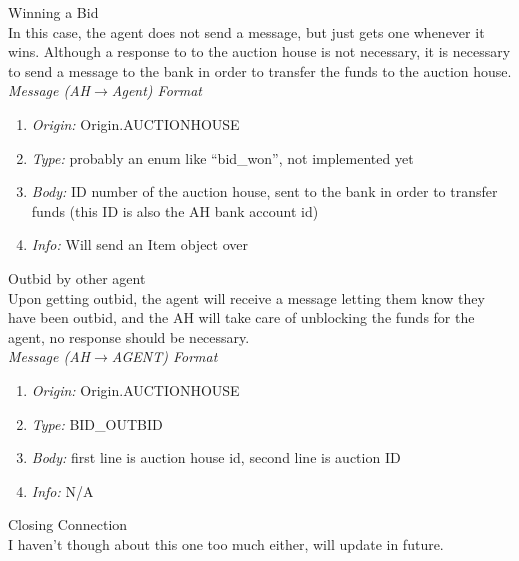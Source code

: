 \documentclass{article}
\begin{document}
\clearpage


\large
Winning a Bid 
\normalsize
\\ In this case, the agent does not send a message, but just gets one whenever it wins. Although a response to to the auction house is not necessary, it is necessary to send a message to the bank in order to transfer the funds to the auction house. 
\footnotesize
\\\emph{Message (AH$\to$Agent) Format} 
\begin{enumerate} 
	\item[]\emph{Origin:} Origin.AUCTIONHOUSE
	\item[]\emph{Type:} probably an enum like ``bid\_won'', not implemented yet 
	\item[]\emph{Body:} ID number of the auction house, sent to the bank in order to transfer funds (this ID is also the AH bank account id) 
	\item[]\emph{Info:} Will send an Item object over 
\end{enumerate}

\vspace{1cm} 

\large
Outbid by other agent 
\normalsize
\\Upon getting outbid, the agent will receive a message letting them know they have been outbid, and the AH will take care of unblocking the funds for the agent, no response should be necessary. 
\footnotesize
\\\emph{Message (AH$\to$AGENT) Format} 
\begin{enumerate}
	\item[]\emph{Origin:} Origin.AUCTIONHOUSE
	\item[]\emph{Type:} BID\_OUTBID 
	\item[]\emph{Body:} first line is auction house id, second line is auction ID
	\item[]\emph{Info:} N/A 
\end{enumerate}

\vspace{1cm}
\normalsize
\large
Closing Connection 
\normalsize
\\ I haven't though about this one too much either, will update in future. 
\end{document}
